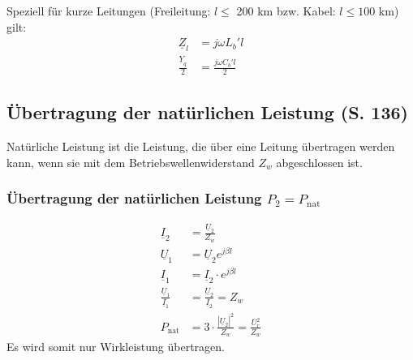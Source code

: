 \documentclass[a4paper,twocolumn,10pt]{article}
\begin{document}
Speziell für kurze Leitungen (Freileitung: $l\leq$ 200 km bzw. Kabel: $l\leq 100$ km) gilt:
\begin{equation*}
\begin{split}
\underline{Z}_l&=j\omega L_b'l\\
\frac{\underline{Y}_q}{2}&=\frac{j\omega C_b'l}{2}
\end{split}
\end{equation*}

\newpage

\subsection{Übertragung der natürlichen Leistung (S. 136)}
Natürliche Leistung ist die Leistung, die über eine Leitung übertragen werden kann, wenn sie mit dem Betriebswellenwiderstand $Z_w$ abgeschlossen ist.

\subsubsection{Übertragung der natürlichen Leistung $P_2=P_{\text{nat}}$ }
\begin{equation*}
\begin{split}
\underline{I}_2&=\frac{\underline{U}_2}{Z_w}\\
\underline{U}_1&=\underline{U}_2e^{j\beta l}\\
\underline{I}_1&=\underline{I}_2\cdot e^{j\beta l}\\
\frac{\underline{U}_1}{\underline{I}_1}&=\frac{\underline{U}_2}{\underline{I}_2}=Z_w\\
P_{\text{nat}}&=3\cdot\frac{|\underline{U}_2|^2}{Z_w}=\frac{U_r^2}{Z_w}
\end{split}
\end{equation*}
Es wird somit nur Wirkleistung übertragen.
\end{document}
